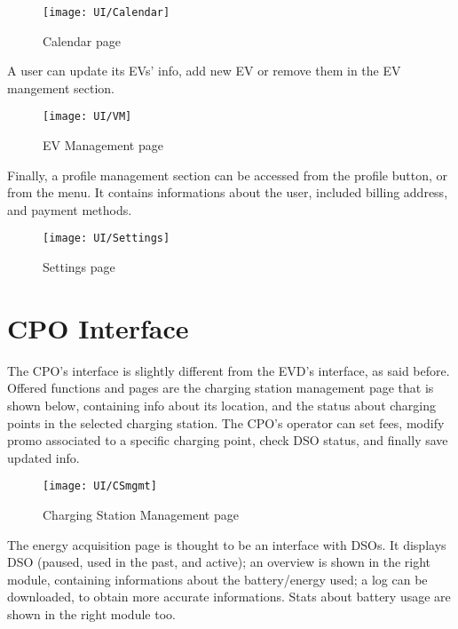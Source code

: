 \begin{figure} [H]
	\begin{center}
		\texttt{[image: UI/Calendar]}
		\caption{Calendar page}
		\label{fig: cd}
	\end{center}
\end{figure}

A user can update its EVs’ info, add new EV or remove them in the EV mangement section.

\begin{figure} [H]
	\begin{center}
		\texttt{[image: UI/VM]}
		\caption{EV Management page}
		\label{fig: cd}
	\end{center}
\end{figure}

Finally, a profile management section can be accessed from the profile button, or from the menu. It contains informations about the user, included billing address, and payment methods.

\begin{figure} [H]
	\begin{center}
		\texttt{[image: UI/Settings]}
		\caption{Settings page}
		\label{fig: cd}
	\end{center}
\end{figure}

\section{CPO Interface}
\label{sec: cpo_interface}%

The CPO’s interface is slightly different from the EVD’s interface, as said before. Offered functions and pages are the charging station management page that is shown below, containing info about its location, and the status about charging points in the selected charging station. The CPO’s operator can set fees, modify promo associated to a specific charging point, check DSO status, and finally save updated info.

\begin{figure} [H]
	\begin{center}
		\texttt{[image: UI/CSmgmt]}
		\caption{Charging Station Management page}
		\label{fig: cd}
	\end{center}
\end{figure}

The energy acquisition page is thought to be an interface with DSOs. It displays DSO (paused, used in the past, and active); an overview is shown in the right module, containing informations about the battery/energy used; a log can be downloaded, to obtain more accurate informations. Stats about battery usage are shown in the right module too.

